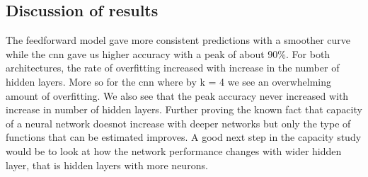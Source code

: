 \documentclass{article}
\begin{document}
\subsection{Discussion of results}
\par The feedforward model gave more consistent predictions with a smoother curve while the cnn gave us higher accuracy with a peak of about 90\%. For both architectures, the rate of overfitting increased with increase in the number of hidden layers. More so for the cnn where by k = 4 we see an overwhelming amount of overfitting. We also see that the peak accuracy never increased with increase in number of hidden layers. Further proving the known fact that capacity of a neural network doesnot increase with deeper networks but only the type of functions that can be estimated improves. A good next step in the capacity study would be to look at how the network performance changes with wider hidden layer, that is hidden layers with more neurons.
\end{document}
